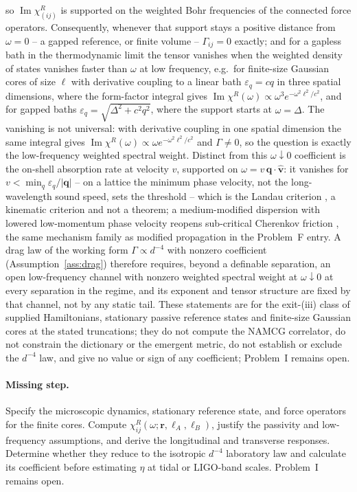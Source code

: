 so \(\operatorname{Im}\chi^R_{(ij)}\) is supported on the weighted Bohr frequencies of the connected force operators. Consequently, whenever that support stays a positive distance from \(\omega=0\) -- a gapped reference, or finite volume -- \(\Gamma_{ij}=0\) exactly; and for a gapless bath in the thermodynamic limit the tensor vanishes when the weighted density of states vanishes faster than \(\omega\) at low frequency, e.g.\ for finite-size Gaussian cores of size \(\ell\) with derivative coupling to a linear bath \(\varepsilon_q=cq\) in three spatial dimensions, where the form-factor integral gives \(\operatorname{Im}\chi^R(\omega)\propto\omega^3 e^{-\omega^2\ell^2/c^2}\), and for gapped baths \(\varepsilon_q=\sqrt{\Delta^2+c^2q^2}\), where the support starts at \(\omega=\Delta\). The vanishing is not universal: with derivative coupling in one spatial dimension the same integral gives \(\operatorname{Im}\chi^R(\omega)\propto\omega e^{-\omega^2\ell^2/c^2}\) and \(\Gamma\neq0\), so the question is exactly the low-frequency weighted spectral weight. Distinct from this \(\omega\downarrow0\) coefficient is the on-shell absorption rate at velocity \(v\), supported on \(\omega=v\,\mathbf q\cdot\hat{\mathbf v}\): it vanishes for \(v<\min_q\varepsilon_q/|\mathbf q|\) -- on a lattice the minimum phase velocity, not the long-wavelength sound speed, sets the threshold -- which is the Landau criterion \cite{Landau1941}, a kinematic criterion and not a theorem; a medium-modified dispersion with lowered low-momentum phase velocity reopens sub-critical Cherenkov friction \cite{BerezhianiElderKhoury2019}, the same mechanism family as modified propagation in the Problem~F entry. A drag law of the working form \(\Gamma\propto d^{-4}\) with nonzero coefficient (Assumption~\ref{ass:drag}) therefore requires, beyond a definable separation, an open low-frequency channel with nonzero weighted spectral weight at \(\omega\downarrow0\) at every separation in the regime, and its exponent and tensor structure are fixed by that channel, not by any static tail. These statements are for the exit-(iii) class of supplied Hamiltonians, stationary passive reference states and finite-size Gaussian cores at the stated truncations; they do not compute the NAMCG correlator, do not constrain the dictionary or the emergent metric, do not establish or exclude the \(d^{-4}\) law, and give no value or sign of any coefficient; Problem~I remains open.

\paragraph{Missing step.}
Specify the microscopic dynamics, stationary reference state, and
force operators for the finite cores. Compute
\(\chi^R_{ij}(\omega;\mathbf r,\ell_A,\ell_B)\), justify the
passivity and low-frequency assumptions, and derive the
longitudinal and transverse responses. Determine whether they
reduce to the isotropic \(d^{-4}\) laboratory law and calculate its
coefficient before estimating \(\eta\) at tidal or LIGO-band scales.
Problem~I remains open.

